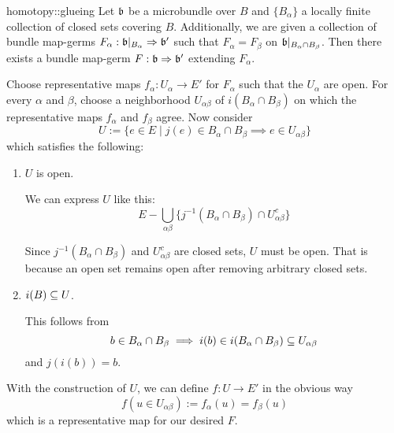 \begin{mylemma}{homotopy::glueing}
    Let $\mathfrak{b}$ be a microbundle over $B$ and $\{B_\alpha\}$ a locally finite collection of closed sets covering $B$.
    Additionally, we are given a collection of bundle map-germs $F_\alpha: \mathfrak{b}\vert_{B_\alpha} \Rightarrow{} \mathfrak{b}'$
    such that $F_\alpha = F_\beta$ on $\mathfrak{b}\vert_{B_\alpha \cap B_\beta}$.
    Then there exists a bundle map-germ $F: \mathfrak{b} \Rightarrow{} \mathfrak{b}'$ extending $F_\alpha$.
\end{mylemma}
\begin{myproof}
    Choose representative maps $f_\alpha: U_\alpha \to E'$ for $F_\alpha$ such that the $U_\alpha$ are open.
    For every $\alpha$ and $\beta$, choose a neighborhood $U_{\alpha\beta}$ of $i(B_\alpha \cap B_\beta)$ on which the representative maps $f_\alpha$ and $f_\beta$ agree.
    Now consider
    \[ U := \{ e \in E \mid j(e) \in B_\alpha \cap B_\beta \implies e \in U_{\alpha\beta} \}\]
    which satisfies the following:
    \begin{enumerate}
        \item $U$ is open.

        We can express $U$ like this:
        \[ E - \bigcup_{\alpha\beta} \{ j^{-1}(B_\alpha \cap B_\beta) \cap U_{\alpha\beta}^c \} \]
        
        Since $j^{-1}(B_\alpha \cap B_\beta)$ and $U_{\alpha\beta}^c$ are closed sets, $U$ must be open.
        That is because an open set remains open after removing arbitrary closed sets.
        \item $i(B) \subseteq{} U$.
        
        This follows from
        \[ b \in B_\alpha \cap B_\beta \implies i(b) \in i(B_\alpha \cap B_\beta) \subseteq{} U_{\alpha\beta} \]
        and $j(i(b)) = b$.
    \end{enumerate}
    With the construction of $U$, we can define $f: U \to E'$ in the obvious way
    \[ f(u \in U_{\alpha\beta}) := f_\alpha(u) = f_\beta(u) \]
    which is a representative map for our desired $F$.
\end{myproof}
